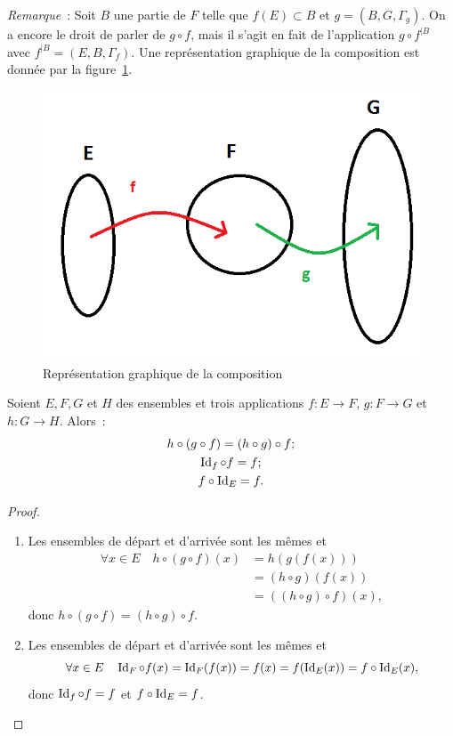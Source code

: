 \emph{Remarque}~: Soit $B$ une partie de $F$ telle que $f(E) \subset B$ et $g=(B,G,\Gamma_g)$. On a encore le droit de parler de $g \circ f$, mais il s'agit en fait de l'application $g \circ f^{|B}$ avec $ f^{|B} =(E,B,\Gamma_f)$.
Une représentation graphique de la composition est donnée par la figure~\ref{chap3-fig:compose}.
%
\begin{figure}
  \centering
  \includegraphics[scale=0.7]{compose.png}
  \caption{Représentation graphique de la composition}
  \label{chap3-fig:compose}
\end{figure}
%
\begin{prop}
  Soient $E,F,G$ et $H$ des ensembles et trois applications $f:E \longrightarrow F$, $g:F \longrightarrow G$ et $h:G \longrightarrow H$. Alors~:
  \begin{gather}
  h \circ (g \circ f)=(h \circ g) \circ f;\\
  \operatorname{Id}_f \circ f = f;\\
  f \circ \operatorname{Id}_E=f.
  \end{gather}
\end{prop}
\begin{proof}
  \begin{enumerate}
  \item Les ensembles de départ et d'arrivée sont les mêmes et 
    \begin{align}
      \forall x \in E \quad h \circ (g \circ f)(x) &=h(g(f(x))) \\ 
      &=(h \circ g)(f(x)) \\ 
      &=((h \circ g) \circ f)(x),
    \end{align}
    donc $h \circ (g \circ f)=(h \circ g) \circ f$.
  \item Les ensembles de départ et d'arrivée sont les mêmes et 
    \begin{equation}
      \forall x \in E \quad \operatorname{Id}_F \circ f(x)=\operatorname{Id}_F(f(x))=f(x)=f(\operatorname{Id}_E(x))=f \circ \operatorname{Id}_E(x),
    \end{equation}
    donc $\operatorname{Id}_f \circ f = f$ et $f \circ \operatorname{Id}_E=f$.
  \end{enumerate}
\end{proof}

